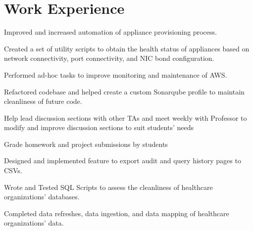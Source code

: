 \documentclass[letterpaper]{deedy-resume} %
\begin{document}
\hfill
%
%
\begin{minipage}[t]{0.65\textwidth} %


\section{Work Experience}

\sectionspace %
\vspace{\topsep} %
\begin{tightitemize}
\item Improved and increased automation of appliance provisioning process.
\item Created a set of utility scripts to obtain the health status of appliances based on network connectivity, port connectivity, and NIC bond configuration.
\item Performed ad-hoc tasks to improve monitoring and maintenance of AWS. 
\item Refactored codebase and helped create a custom Sonarqube profile to maintain cleanliness of future code.
\end{tightitemize}
\sectionspace %

\begin{tightitemize}
\item Help lead discussion sections with other TAs and meet weekly with Professor to modify and improve discussion sections to suit students’ needs
\item Grade homework and project submissions by students
\end{tightitemize}

\sectionspace %
\begin{tightitemize}
\item Designed and implemented feature to export audit and query history pages to CSVs. 
\item Wrote and Tested SQL Scripts to assess the cleanliness of healthcare organizations’ databases.
\item Completed data refreshes, data ingestion, and data mapping of healthcare organizations' data.
\end{tightitemize}


\end{minipage}
\end{document}
